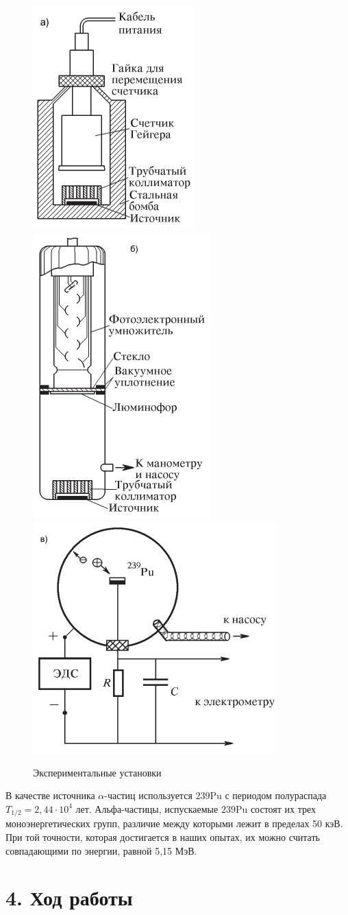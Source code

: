\documentclass[a4paper,12pt]{report}
\begin{document}
        \begin{figure}[h!]
            \includegraphics[width=.3\textwidth]{ustanovka1.pdf}\hfill
            \includegraphics[width=.3\textwidth]{ustanovka2.pdf}\hfill
            \includegraphics[width=.3\textwidth]{ustanovka3.pdf}
            \caption{Экспериментальные установки}
        \end{figure}
        
	В качестве источника $\alpha$-частиц используется ${239}$Pu с периодом полураспада $T_{1/2} = 2,44 \cdot 10^4$ лет. Альфа-частицы, испускаемые ${239}$Pu состоят их трех моноэнергетических групп, различие между которыми лежит в пределах 50 кэВ. При той точности, которая достигается в наших опытах, их можно считать совпадающими по энергии, равной 5,15 МэВ.
	
	
\section*{4. Ход работы}
\end{document}
